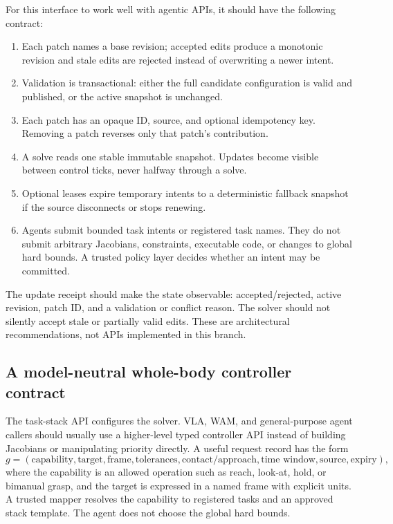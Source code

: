 \documentclass[11pt]{article}
\begin{document}
For this interface to work well with agentic APIs, it should have the
following contract:
\begin{enumerate}[leftmargin=*,nosep]
  \item Each patch names a base revision; accepted edits produce a monotonic
        revision and stale edits are rejected instead of overwriting a newer
        intent.
  \item Validation is transactional: either the full candidate configuration
        is valid and published, or the active snapshot is unchanged.
  \item Each patch has an opaque ID, source, and optional idempotency key.
        Removing a patch reverses only that patch's contribution.
  \item A solve reads one stable immutable snapshot. Updates become visible
        between control ticks, never halfway through a solve.
  \item Optional leases expire temporary intents to a deterministic fallback
        snapshot if the source disconnects or stops renewing.
  \item Agents submit bounded task intents or registered task names. They do
        not submit arbitrary Jacobians, constraints, executable code, or
        changes to global hard bounds. A trusted policy layer decides whether
        an intent may be committed.
\end{enumerate}
The update receipt should make the state observable: accepted/rejected,
active revision, patch ID, and a validation or conflict reason. The solver
should not silently accept stale or partially valid edits. These are
architectural recommendations, not APIs implemented in this branch.

\subsection{A model-neutral whole-body controller contract}

The task-stack API configures the solver. VLA, WAM, and general-purpose agent
callers should usually use a higher-level typed controller API instead of
building Jacobians or manipulating priority directly. A useful request record
has the form
\begin{equation}
  g=(\text{capability},\text{target},\text{frame},\text{tolerances},
      \text{contact/approach},\text{time window},\text{source},\text{expiry}),
\end{equation}
where the capability is an allowed operation such as reach, look-at, hold, or
bimanual grasp, and the target is expressed in a named frame with explicit
units. A trusted mapper resolves the capability to registered tasks and an
approved stack template. The agent does not choose the global hard bounds.
\end{document}
